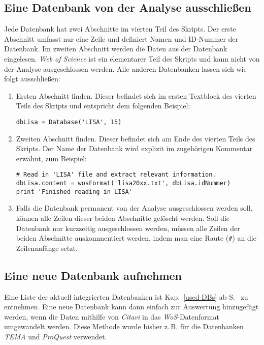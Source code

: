 \subsection{Eine Datenbank von der Analyse ausschließen}
Jede Datenbank hat zwei Abschnitte im vierten Teil des Skripts. Der erste Abschnitt umfasst nur eine Zeile und definiert Namen und ID-Nummer der Datenbank. Im zweiten Abschnitt werden die Daten aus der Datenbank eingelesen. \textit{Web of Science} ist ein elementarer Teil des Skripts und kann nicht von der Analyse ausgeschlossen werden. Alle anderen Datenbanken lassen sich wie folgt ausschließen:
\begin{enumerate}
\item Ersten Abschnitt finden. Dieser befindet sich im ersten Textblock des vierten Teils des Skripts und entspricht dem folgenden Beispiel:
\begin{verbatim}
dbLisa = Database('LISA', 15)
\end{verbatim}
\item Zweiten Abschnitt finden. Dieser befindet sich am Ende des vierten Teils des Skripts. Der Name der Datenbank wird explizit im zugehörigen Kommentar erwähnt, zum Beispiel:
\begin{verbatim}
# Read in 'LISA' file and extract relevant information.
dbLisa.content = wosFormat('lisa20xx.txt', dbLisa.idNummer)
print 'Finished reading in LISA'
\end{verbatim}
\item Falls die Datenbank permanent von der Analyse ausgeschlossen werden soll, können alle Zeilen dieser beiden Abschnitte gelöscht werden. Soll die Datenbank nur kurzzeitig ausgeschlossen werden, müssen  alle Zeilen der beiden Abschnitte auskommentiert werden, indem man eine Raute (\texttt{\#}) an die Zeilenanfänge setzt.
\end{enumerate}

\subsection{Eine neue Datenbank aufnehmen}
Eine Liste der aktuell integrierten Datenbanken ist Kap.~\ref{used-DBs} ab S.~\pageref{used-DBs} zu entnehmen. Eine neue Datenbank kann dann einfach zur Auswertung hinzugefügt werden, wenn die Daten mithilfe von \textit{Citavi} in das \textit{WoS}-Datenformat umgewandelt werden. Diese Methode wurde bisher z.\,B. für die Datenbanken \textit{TEMA} und \textit{ProQuest} verwendet.


